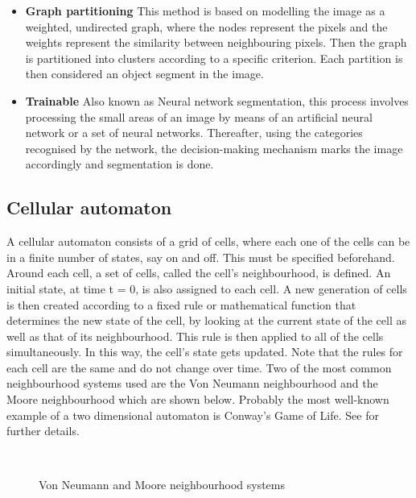 \documentclass[a4paper,10pt]{article}
\begin{document}
\begin{itemize}
 \item \textbf{Graph partitioning} This method is based on modelling
the image as a weighted, undirected graph, where the nodes represent the pixels
and the weights represent the similarity between neighbouring pixels. Then the
graph is partitioned into clusters according to a specific criterion.  Each
partition is then considered an object segment in the image.       
 \item \textbf{Trainable} Also known as Neural network segmentation,
this process involves processing the small areas of an image by means of an
artificial neural network or a set of neural networks.  Thereafter, using the
categories recognised by the network, the decision-making mechanism marks the
image accordingly and segmentation is done.
\end{itemize}

\subsection{Cellular automaton}
A cellular automaton consists of a grid of cells, where each one of the cells
can be in a finite number of states, say on and off.  This must be specified
beforehand.  Around each cell, a set of cells, called the cell's neighbourhood,
is defined.  An initial state, at time t = 0, is also assigned to each cell.  A
new generation of cells is then created according to a fixed rule or
mathematical function that determines the new state of the cell, by looking at
the current state of the cell as well as that of its neighbourhood.  This rule
is then applied to all of the cells simultaneously.  In this way, the cell's
state gets updated.  Note that the rules for each cell are the same and do not
change over time.  Two of the most common neighbourhood systems used are the Von
Neumann neighbourhood and the Moore neighbourhood which are shown below. 
Probably the most well-known example of a two dimensional automaton is Conway's
Game of Life.  See \cite{gol} for further details.

\begin{figure}[H]
\centering
\mbox{ \quad
{}} \caption{Von Neumann and
Moore neighbourhood systems \cite{n}}
\end{figure}
\end{document}

